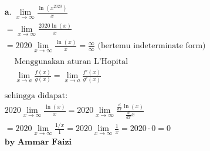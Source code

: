 \documentclass[12pt]{article}
\begin{document}
\par\noindent
\begin{fleqn}[1em]

\begin{align*}
\boxed{
\begin{aligned}
  & \textbf{a. } \lim_{x \to \infty} \frac{\ln\left(x^{2020}\right)}{x} \\
  & = \lim_{x \to \infty} \frac{2020 \ln\left(x\right)}{x} \\
  & = 2020 \lim_{x \to \infty} \frac{\ln\left(x\right)}{x}
    = \frac{\infty}{\infty} \text{ (bertemu indeterminate form)} \\
  & \boxed{
    \begin{aligned}
      & \text{Menggunakan aturan L'Hopital} \\
      & \lim_{x \to a} \frac{f(x)}{g(x)} = \lim_{x \to a} \frac{f'(x)}{g'(x)} \\
    \end{aligned}
  } \\
  & \text{sehingga didapat: } \\
  & 2020 \lim_{x \to \infty} \frac{\ln\left(x\right)}{x}
    = 2020 \lim_{x \to \infty} \frac{\frac{d}{dx} \ln\left(x\right)}{\frac{d}{dx} x} \\ ~
  & = 2020 \lim_{x \to \infty} \frac{1/x}{1}
    = 2020 \lim_{x \to \infty} \frac{1}{x} = 2020 \cdot 0 = 0
    \\ & \textbf{by Ammar Faizi}
\end{aligned}
}
\end{align*}


\end{fleqn}
\end{document}
